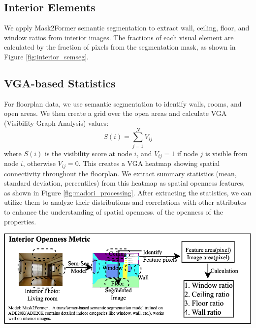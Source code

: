 \documentclass[11pt,a4paper]{article}
\begin{document}
\begin{multicols}{2}
\subsection{Interior Elements}
We apply Mask2Former semantic segmentation to extract wall, ceiling, floor, and window ratios from interior images. 
The fractions of each visual element are calculated by the fraction of pixels from the segmentation mask, as shown in
Figure \ref{fig:interior_semseg}.
\vspace{1em}


\subsection{VGA-based Statistics}
For floorplan data, we use semantic segmentation to identify walls, rooms, and open areas. 
We then create a grid over the open areas and calculate VGA (Visibility Graph Analysis) values:
\begin{equation}
\label{eq:vga_definition}
S(i) = \sum_{j=1}^{N} V_{ij}
\end{equation}
where $S(i)$ is the visibility score at node $i$, and $V_{ij} = 1$ if node $j$ is visible from node $i$, otherwise $V_{ij} = 0$. 
This creates a VGA heatmap showing spatial connectivity throughout the floorplan. We extract summary statistics 
(mean, standard deviation, percentiles) from this heatmap as spatial openness features, as shown in Figure \ref{fig:madori_processing}.
After extracting the statistics, we can utilize them to analyze their distributions and correlations with other attributes to enhance the understanding of spatial openness.
of the openness of the properties.

\begin{center}
    \includegraphics[width=0.99\columnwidth]{plots/exp_lv_semseg_5.png}
    \label{fig:interior_semseg}
\end{center}
\vspace{1em}


\end{multicols}
\end{document}
